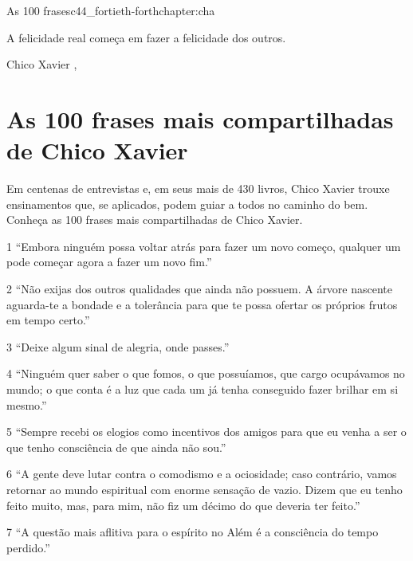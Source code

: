\begin{chapterpage}{As 100 frases}{c44_fortieth-forthchapter:cha}
 
\begin{myquotation}A felicidade real começa em fazer a felicidade dos outros.
\par\vspace*{15mm}
\mbox{}\hfill \emdash{}Chico Xavier
, %
\par\end{myquotation}

\end{chapterpage}



\section{As 100 frases mais compartilhadas de Chico Xavier}\label{c1_basicformatting:sec}

\emdash{}Em centenas de entrevistas e, em seus mais de 430 livros, Chico Xavier trouxe ensinamentos que, se aplicados, podem guiar a todos no caminho do bem. Conheça as 100 frases mais compartilhadas de Chico Xavier.

1 ``Embora ninguém possa voltar atrás para fazer um novo começo, qualquer um pode começar agora a fazer um novo fim.”

2 ``Não exijas dos outros qualidades que ainda não possuem. A árvore nascente aguarda-te a bondade e a tolerância para que te possa ofertar os próprios frutos em tempo certo.”

3 ``Deixe algum sinal de alegria, onde passes.”

4 ``Ninguém quer saber o que fomos, o que possuíamos, que cargo ocupávamos no mundo; o que conta é a luz que cada um já tenha conseguido fazer brilhar em si mesmo.”

5 ``Sempre recebi os elogios como incentivos dos amigos para que eu venha a ser o que tenho consciência de que ainda não sou.”

6 ``A gente deve lutar contra o comodismo e a ociosidade; caso contrário, vamos retornar ao mundo espiritual com enorme sensação de vazio. Dizem que eu tenho feito muito, mas, para mim, não fiz um décimo do que deveria ter feito.”

7 ``A questão mais aflitiva para o espírito no Além é a consciência do tempo perdido.”

